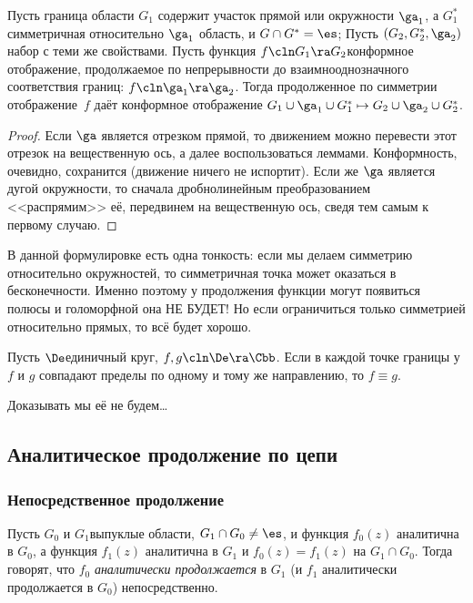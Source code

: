 \documentclass[a4paper]{article}
\begin{document}
\begin{theorem}
\begin{theorem}
Пусть граница области $G_1$ содержит участок прямой или окружности $\ga_1$, а $G_1^*$\т
симметричная относительно $\ga_1$ область, и $G \cap G^*=\es$;
Пусть $(G_2, G_2^*,\ga_2)$\т набор с теми же свойствами. Пусть функция $f\cln G_1\ra G_2$\т конформное
отображение, продолжаемое по непрерывности до взаимно\д однозначного соответствия границ: $f\cln \ga_1 \ra \ga_2$.
Тогда продолженное по симметрии отображение~$f$ даёт конформное отображение
$G_1\cup\ga_1\cup G_1^* \mapsto G_2\cup\ga_2\cup G_2^*$.
\end{theorem}
\begin{proof}
Если $\ga$ является отрезком прямой, то движением можно перевести этот отрезок на вещественную ось, а далее воспользоваться
леммами. Конформность, очевидно, сохранится (движение ничего не испортит). Если же $\ga$ является дугой окружности, то
сначала дробно\д линейным преобразованием <<распрямим>> её, передвинем на вещественную ось, сведя тем самым к первому случаю.
\end{proof}
\begin{note}
В данной формулировке есть одна тонкость: если мы делаем симметрию относительно окружностей,
то симметричная точка может оказаться в бесконечности. Именно поэтому у продолжения функции могут появиться полюсы
и голоморфной она НЕ БУДЕТ! Но если ограничиться только симметрией относительно прямых, то всё будет хорошо.
\end{note}

\begin{theorem}[И.\,И.\,Привалов, 1918]
Пусть $\De$\т единичный круг, $f,g\cln \De \ra \Cbb$. Если в каждой точке границы
у $f$ и $g$ совпадают пределы по одному и тому же направлению, то $f\equiv g$.
\end{theorem}
Доказывать мы её не будем\dots

\subsection{Аналитическое продолжение по цепи}

\subsubsection{Непосредственное продолжение}

\begin{df}
Пусть $G_0$ и $G_1$\т выпуклые области, $G_1 \cap G_0\neq \es$,  и функция $f_0(z)$ аналитична в $G_0$,
а функция $f_1(z)$ аналитична в $G_1$ и $f_0(z)=f_1(z)$ на $G_1 \cap G_0$. Тогда говорят, что $f_0$
\emph{аналитически продолжается} в $G_1$ (и $f_1$ аналитически продолжается в $G_0$) непосредственно.
\end{df}


\end{theorem}
\end{document}
